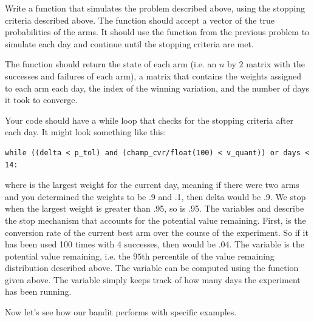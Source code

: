 \begin{problem}
Write a function that simulates the problem described above, using the stopping criteria described above.  The function should accept a vector of the true probabilities of the arms.  It should use the function from the previous problem to simulate each day and continue until the stopping criteria are met.

The function should return the state of each arm (i.e. an $n$ by $2$ matrix with the successes and failures of each arm), a matrix that contains the weights assigned to each arm each day, the index of the winning variation, and the number of days it took to converge.

Your code should have a while loop that checks for the stopping criteria after each day.  It might look something like this:
\newpage
\begin{lstlisting}
while ((delta < p_tol) and (champ_cvr/float(100) < v_quant)) or days < 14:
\end{lstlisting}
where  is the largest weight for the current day, meaning if there were two arms and you determined the weights to be .9 and .1, then delta would be .9.  We stop when the largest weight is greater than .95, so  is .95.  The variables  and  describe the stop mechanism that accounts for the potential value remaining.  First,  is the conversion rate of the current best arm over the course of the experiment.  So if it has been used 100 times with 4 successes, then  would be .04.  The variable  is the potential value remaining, i.e. the $95$th percentile of the value remaining distribution described above.  The variable  can be computed using the  function given above.
The  variable simply keeps track of how many days the experiment has been running.
\end{problem}

Now let's see how our bandit performs with specific examples.

